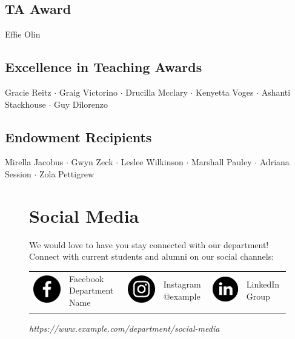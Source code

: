 \documentclass{book} %
\begin{document}
\subsection*{TA Award}
Effie Olin
\subsection*{Excellence in Teaching Awards}
Gracie Reitz $\cdot$ Graig Victorino  $\cdot$ Drucilla Mcclary $\cdot$ Kenyetta Voges $\cdot$ Ashanti Stackhouse $\cdot$ Guy Dilorenzo
\subsection*{Endowment Recipients}
Mirella Jacobus $\cdot$ Gwyn Zeck $\cdot$ Leslee Wilkinson $\cdot$ Marshall Pauley $\cdot$ Adriana Session $\cdot$ Zola Pettigrew

\begin{figure}[b]

\section*{Social Media}
We would love to have you stay connected with our department! Connect with current students and alumni on our social channels:
\smallskip
  \begin{center}
 \begin{tabular}{ m{1cm} m{3cm} m{1cm} m{3cm} m{1cm} m{3cm} }
  \includegraphics[width=.5in]{assets/fb-icon.png} & Facebook Department Name & \includegraphics[width=.5in]{assets/ig-icon.png} & Instagram @example & \includegraphics[width=.5in]{assets/ln-icon.png} & LinkedIn Group\\
  \smallskip \\
 \end{tabular}
 \em https://www.example.com/department/social-media
  \end{center}
\end{figure}
\clearpage
\end{document}

